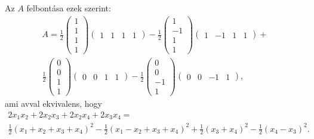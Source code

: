 \documentclass[a4paper, showtrims]{memoir}
\theoremstyle{plain}
\theoremstyle{remark}
\theoremstyle{definition}
\begin{document}
Az $A$ felbontása ezek szerint:
\begin{multline*}
    A
    =
    \frac{1}{2}
    \begin{pmatrix}
        1\\1\\1\\1
    \end{pmatrix}
    \begin{pmatrix}
        1&1&1&1
    \end{pmatrix}
    -
    \frac{1}{2}
    \begin{pmatrix}
        1\\-1\\1\\1
    \end{pmatrix}
    \begin{pmatrix}
        1&-1&1&1
    \end{pmatrix}
    +
    \\
    \frac{1}{2}
    \begin{pmatrix}
        0\\0\\1\\1
    \end{pmatrix}
    \begin{pmatrix}
        0&0&1&1
    \end{pmatrix}
    -
    \frac{1}{2}
    \begin{pmatrix}
        0\\0\\-1\\1
    \end{pmatrix}
    \begin{pmatrix}
        0&0&-1&1
    \end{pmatrix},
\end{multline*}
ami avval ekvivalens, hogy
\begin{multline*}
2x_1x_2+2x_2x_3+2x_2x_4+2x_3x_4
=\\
\frac{1}{2}\left( x_1+x_2+x_3+x_4 \right)^2
-\frac{1}{2}\left( x_1-x_2+x_3+x_4 \right)^2
+\frac{1}{2}\left( x_3+x_4 \right)^2
-\frac{1}{2}\left( x_4-x_3 \right)^2.
\end{multline*}

\backmatter
\pagestyle{empty}
%
\printbibliography
\printindex
\end{document}
